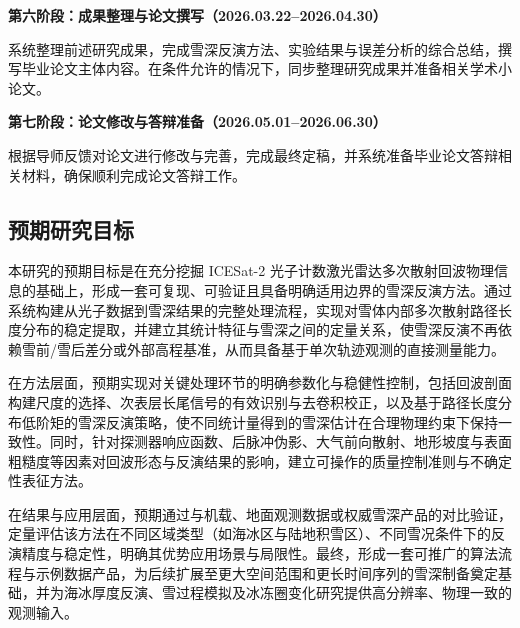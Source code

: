 \textbf{第六阶段：成果整理与论文撰写（2026.03.22--2026.04.30）}

系统整理前述研究成果，完成雪深反演方法、实验结果与误差分析的综合总结，撰写毕业论文主体内容。在条件允许的情况下，同步整理研究成果并准备相关学术小论文。

\textbf{第七阶段：论文修改与答辩准备（2026.05.01--2026.06.30）}

根据导师反馈对论文进行修改与完善，完成最终定稿，并系统准备毕业论文答辩相关材料，确保顺利完成论文答辩工作。

\subsection{预期研究目标}

本研究的预期目标是在充分挖掘 ICESat-2 光子计数激光雷达多次散射回波物理信息的基础上，形成一套可复现、可验证且具备明确适用边界的雪深反演方法。通过系统构建从光子数据到雪深结果的完整处理流程，实现对雪体内部多次散射路径长度分布的稳定提取，并建立其统计特征与雪深之间的定量关系，使雪深反演不再依赖雪前/雪后差分或外部高程基准，从而具备基于单次轨迹观测的直接测量能力。

在方法层面，预期实现对关键处理环节的明确参数化与稳健性控制，包括回波剖面构建尺度的选择、次表层长尾信号的有效识别与去卷积校正，以及基于路径长度分布低阶矩的雪深反演策略，使不同统计量得到的雪深估计在合理物理约束下保持一致性。同时，针对探测器响应函数、后脉冲伪影、大气前向散射、地形坡度与表面粗糙度等因素对回波形态与反演结果的影响，建立可操作的质量控制准则与不确定性表征方法。

在结果与应用层面，预期通过与机载、地面观测数据或权威雪深产品的对比验证，定量评估该方法在不同区域类型（如海冰区与陆地积雪区）、不同雪况条件下的反演精度与稳定性，明确其优势应用场景与局限性。最终，形成一套可推广的算法流程与示例数据产品，为后续扩展至更大空间范围和更长时间序列的雪深制备奠定基础，并为海冰厚度反演、雪过程模拟及冰冻圈变化研究提供高分辨率、物理一致的观测输入。

